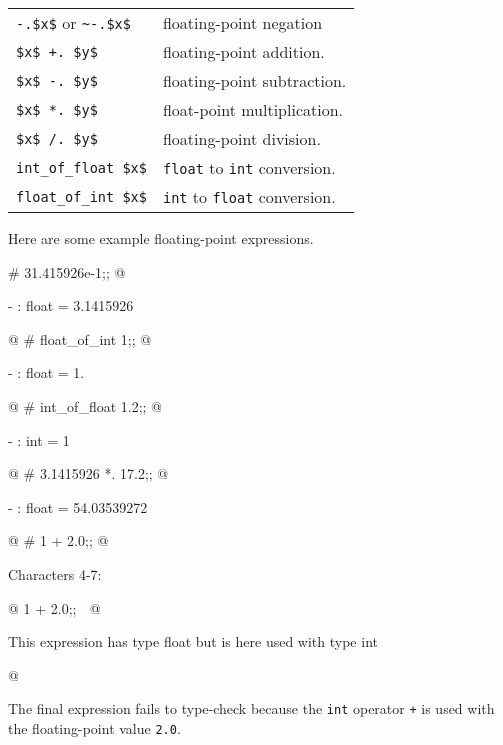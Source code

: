 \label{keyword:+.}
\label{keyword:-.}
\label{keyword:*.}
\label{keyword:/.}
\begin{center}
\begin{tabular}{@{}ll@{}}
\index{-.@\lstinline$~-.$ floating-point negation}
\hbox{\hbox{\lstinline/-.$x$/}} or \hbox{\lstinline/~-.$x$/} & floating-point negation\\
\index{+.@\lstinline$+.$ floating-point addition}
\hbox{\hbox{\lstinline/$x$ +. $y$/}} & floating-point addition.\\
\index{-.@\lstinline{-.} floating-point subtraction}
\hbox{\hbox{\lstinline/$x$ -. $y$/}} & floating-point subtraction.\\
\index{*.@\lstinline$*.$ floating-point multiplication}
\hbox{\hbox{\lstinline/$x$ *. $y$/}} & float-point multiplication.\\
\index{/.@\lstinline$/.$ floating-point division}
\hbox{\lstinline+$x$ /. $y$+} & floating-point division.\\
\index{int\_of\_float@\lstinline$int_of_float$}
\hbox{\hbox{\lstinline/int_of_float $x$/}} & \hbox{\lstinline+float+} to \hbox{\lstinline+int+} conversion.\\
\index{float\_of\_int@\lstinline$float_of_int$}
\hbox{\hbox{\lstinline/float_of_int $x$/}} & \hbox{\lstinline+int+} to \hbox{\lstinline+float+} conversion.
\end{tabular}
\end{center}
%
Here are some example floating-point expressions.

\begin{ocaml}
# 31.415926e-1;;
@
\begin{topoutput}
- : float = 3.1415926
\end{topoutput}
@
# float_of_int 1;;
@
\begin{topoutput}
- : float = 1.
\end{topoutput}
@
# int_of_float 1.2;;
@
\begin{topoutput}
- : int = 1
\end{topoutput}
@
# 3.1415926 *. 17.2;;
@
\begin{topoutput}
- : float = 54.03539272
\end{topoutput}
@
# 1 + 2.0;;
@
\begin{toperror}
Characters 4-7:
\end{toperror}
@
  1 + 2.0;;
      ^^^
@
\begin{toperror}
This expression has type float but is here used with type int
\end{toperror}
@
\end{ocaml}
%
The final expression fails to type-check because the \hbox{\lstinline/int/} operator
\hbox{\lstinline/+/} is used with the floating-point value \hbox{\lstinline/2.0/}.

